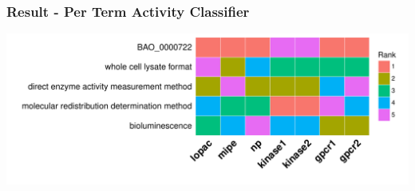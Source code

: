\documentclass[anchorcolor=blue,linkcolor=blue]{beamer}
\begin{document}
  \begin{frame}
    \frametitle{Result - Per Term Activity Classifier}
    \begin{center}
      \includegraphics[width=1.1\textwidth]{img-predset-rankedterms.pdf}      
    \end{center}
  \end{frame}
\end{document}
